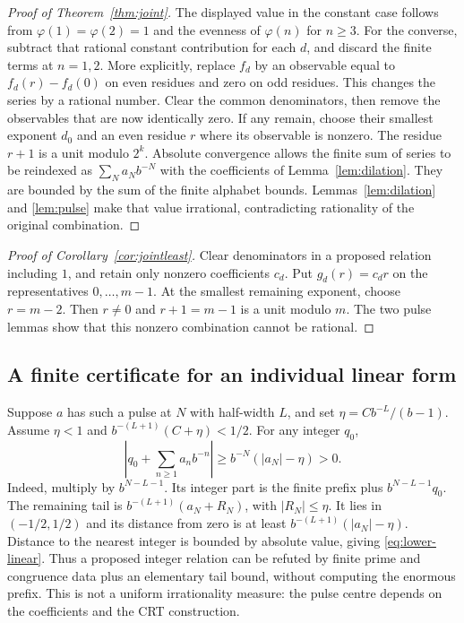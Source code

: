 \documentclass[11pt,a4paper]{article}
\theoremstyle{definition}\newtheorem{definition}[theorem]{Definition}
\theoremstyle{remark}\newtheorem{remark}[theorem]{Remark}
\newcommand{\ph}{\varphi}\newcommand{\rad}{\operatorname{rad}}
\begin{document}
\begin{proof}[Proof of Theorem~\ref{thm:joint}]
The displayed value in the constant case follows from $\ph(1)=\ph(2)=1$
and the evenness of $\ph(n)$ for $n\ge3$.
For the converse, subtract that rational constant contribution for each $d$,
and discard the finite terms at $n=1,2$. More explicitly, replace $f_d$ by
an observable equal to $f_d(r)-f_d(0)$ on even residues and zero on odd residues.
This changes the series by a rational number. Clear the common denominators,
then remove the observables that are now identically zero.
If any remain, choose their smallest exponent $d_0$ and an even residue $r$
where its observable is nonzero. The residue $r+1$ is a unit modulo $2^k$.
Absolute convergence allows the finite sum of series to be reindexed as
$\sum_Na_Nb^{-N}$ with the coefficients of Lemma~\ref{lem:dilation}.
They are bounded by the sum of the finite alphabet bounds.
Lemmas~\ref{lem:dilation} and \ref{lem:pulse} make that value irrational,
contradicting rationality of the original combination.
\end{proof}

\begin{proof}[Proof of Corollary~\ref{cor:jointleast}]
Clear denominators in a proposed relation including $1$, and retain only
nonzero coefficients $c_d$. Put $g_d(r)=c_dr$ on the representatives
$0,\ldots,m-1$. At the smallest remaining exponent, choose $r=m-2$.
Then $r\ne0$ and $r+1=m-1$ is a unit modulo $m$.
The two pulse lemmas show that this nonzero combination cannot be rational.
\end{proof}

\subsection{A finite certificate for an individual linear form}
Suppose $a$ has such a pulse at $N$ with half-width $L$, and set
$\eta=Cb^{-L}/(b-1)$. Assume $\eta<1$ and
$b^{-(L+1)}(C+\eta)<1/2$. For any integer $q_0$,
\begin{equation}\label{eq:lower-linear}
 \left|q_0+\sum_{n\ge1}a_nb^{-n}\right|
 \ge b^{-N}(|a_N|-\eta)>0.
\end{equation}
Indeed, multiply by $b^{N-L-1}$. Its integer part is the finite prefix plus
$b^{N-L-1}q_0$. The remaining tail is
$b^{-(L+1)}(a_N+R_N)$, with $|R_N|\le\eta$.
It lies in $(-1/2,1/2)$ and its distance from zero is at least
$b^{-(L+1)}(|a_N|-\eta)$. Distance to the nearest integer is bounded by
absolute value, giving \eqref{eq:lower-linear}.
Thus a proposed integer relation can be refuted by finite prime and congruence
data plus an elementary tail bound, without computing the enormous prefix.
This is not a uniform irrationality measure: the pulse centre depends on the
coefficients and the CRT construction.
\end{document}
